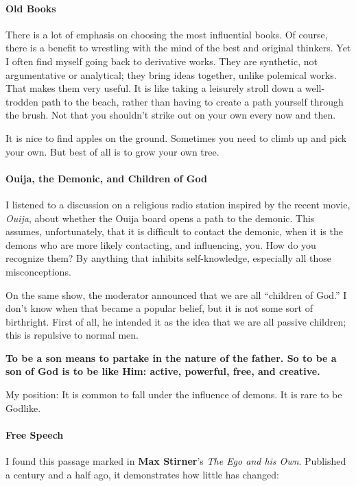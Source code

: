 \paragraph{Old Books}


There is a lot of emphasis on choosing the most influential books. Of course, there is a benefit to wrestling with the mind of the best and original thinkers. Yet I often find myself going back to derivative works. They are synthetic, not argumentative or analytical; they bring ideas together, unlike polemical works. That makes them very useful. It is like taking a leisurely stroll down a well-trodden path to the beach, rather than having to create a path yourself through the brush. Not that you shouldn't strike out on your own every now and then.

It is nice to find apples on the ground. Sometimes you need to climb up and pick your own. But best of all is to grow your own tree.

\paragraph{Ouija, the Demonic, and Children of God}


I listened to a discussion on a religious radio station inspired by the recent movie, \emph{Ouija}, about whether the Ouija board opens a path to the demonic. This assumes, unfortunately, that it is difficult to contact the demonic, when it is the demons who are more likely contacting, and influencing, you. How do you recognize them? By anything that inhibits self-knowledge, especially all those misconceptions.

On the same show, the moderator announced that we are all ``children of God.'' I don't know when that became a popular belief, but it is not some sort of birthright. First of all, he intended it as the idea that we are all passive children; this is repulsive to normal men.

\textbf{To be a son means to partake in the nature of the father. So to be a son of God is to be like Him: active, powerful, free, and creative.}

My position: It is common to fall under the influence of demons. It is rare to be Godlike.

\paragraph{Free Speech}


I found this passage marked in \textbf{Max Stirner}'s \emph{The Ego and his Own}. Published a century and a half ago, it demonstrates how little has changed:

